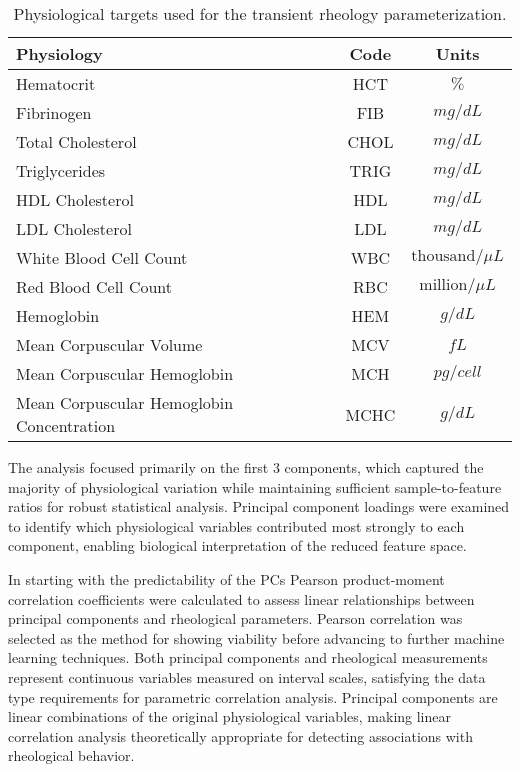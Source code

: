 \documentclass[12pt,letterpaper]{article}
\begin{document}
\begin{table}[]
    \centering
    \caption{Physiological targets used for the transient rheology parameterization.}
    \begin{tabular}{lcc}
        Physiology                                & Code & Units \\
        \hline
        Hematocrit                                & HCT  & $\%$ \\
        Fibrinogen                                & FIB  & $mg/dL$ \\
        Total Cholesterol                         & CHOL & $mg/dL$ \\
        Triglycerides                             & TRIG & $mg/dL$ \\
        HDL Cholesterol                           & HDL  & $mg/dL$ \\
        LDL Cholesterol                           & LDL  & $mg/dL$ \\
        White Blood Cell Count                    & WBC  & $\text{thousand}/\mu L$ \\
        Red Blood Cell Count                      & RBC  & $\text{million}/\mu L$ \\
        Hemoglobin                                & HEM  & $g/dL$ \\
        Mean Corpuscular Volume                   & MCV  & $fL$ \\
        Mean Corpuscular Hemoglobin               & MCH  & $pg/cell$ \\
        Mean Corpuscular Hemoglobin Concentration & MCHC & $g/dL$
    \end{tabular}
    \label{need label}
\end{table}

The analysis focused primarily on the first 3 components, which captured the majority of physiological variation while maintaining sufficient sample-to-feature ratios for
robust statistical analysis. Principal component loadings were examined to identify which physiological variables contributed most strongly to each component, enabling biological
interpretation of the reduced feature space.

In starting with the predictability of the PCs Pearson product-moment correlation coefficients were calculated to assess linear relationships between principal components and
rheological parameters. Pearson correlation was selected as the method for showing viability before advancing to further machine learning techniques. Both principal components
and rheological measurements represent continuous variables measured on interval scales, satisfying the data type requirements for parametric correlation analysis.
Principal components are linear combinations of the original physiological variables, making linear correlation analysis theoretically appropriate for detecting associations
with rheological behavior.
\end{document}
